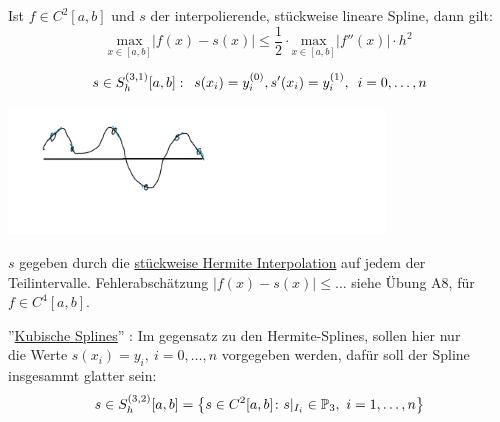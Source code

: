 \documentclass[../Skript.tex]{subfiles}
\begin{document}
\begin{corollary}
    Ist $f\in C^2[a,b]$ und $s$ der interpolierende, stückweise lineare Spline, dann gilt:\[
    \underset{x\in [a,b]}{\text{max}} |f(x)-s(x)| \leq \frac{1}{2}\cdot \underset{x\in [a,b]}{\text{max}}|f''(x)|\cdot h^2
    \]
\end{corollary}
\begin{example}
    \[s\in S_h^{(3,1)}[a,b]: \hspace{.5em} s(x_i) = y_i^{(0)}, s'(x_i)=y_i^{(1)}, \hspace{.5em} i=0,\dots,n\]
    \begin{center}
        \includegraphics[width=100mm]{Bilder/161122_1.png}
    \end{center}
    $s$ gegeben durch die \underline{stückweise Hermite Interpolation} auf jedem der Teilintervalle.
    Fehlerabschätzung $|f(x)-s(x)|\leq \dots$ siehe Übung A8, für $f\in C^4[a,b]$.\\
\end{example}
''\underline{Kubische Splines}'' : Im gegensatz zu den Hermite-Splines, sollen hier nur \\ die Werte $s(x_i)=y_i,\ 
i=0,\dots, n$ 
vorgegeben werden, dafür soll der Spline insgesammt glatter sein:\[
s\in S_h^{(3,2)}[a,b]=\left\{s\in C^2[a,b]\colon s\vert_{I_i}\in \mathbb{P}_3 , \ i=1,\dots, n\right\}\]
\end{document}

